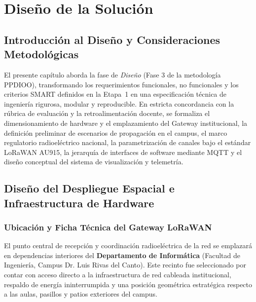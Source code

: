 \documentclass[12pt,oneside,openany,spanish,oldfontcommands]{memoir}
\begin{document}
\chapter{Diseño de la Solución}\label{cap:diseno-solucion}

\section{Introducción al Diseño y Consideraciones Metodológicas}

El presente capítulo aborda la fase de \textit{Diseño} (Fase 3 de la metodología PPDIOO),
transformando los requerimientos funcionales, no funcionales y los criterios SMART definidos
en la Etapa~1 en una especificación técnica de ingeniería rigurosa, modular y reproducible.
En estricta concordancia con la rúbrica de evaluación y la retroalimentación docente, se
formaliza el dimensionamiento de hardware y el emplazamiento del Gateway institucional, la
definición preliminar de escenarios de propagación en el campus, el marco regulatorio
radioeléctrico nacional, la parametrización de canales bajo el estándar LoRaWAN AU915, la
jerarquía de interfaces de software mediante MQTT y el diseño conceptual del sistema de
visualización y telemetría.

\section{Diseño del Despliegue Espacial e Infraestructura de Hardware}\label{sec:despliegue-hardware}

\subsection{Ubicación y Ficha Técnica del Gateway LoRaWAN}

El punto central de recepción y coordinación radioeléctrica de la red se emplazará en
dependencias interiores del \textbf{Departamento de Informática} (Facultad de Ingeniería,
Campus Dr. Luis Rivas del Canto). Este recinto fue seleccionado por contar con acceso directo a
la infraestructura de red cableada institucional, respaldo de energía ininterrumpida y una
posición geométrica estratégica respecto a las aulas, pasillos y patios exteriores del campus.
\end{document}
